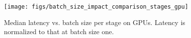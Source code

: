 \begin{figure}[!t]
    \centering
    \texttt{[image: figs/batch\_size\_impact\_comparison\_stages\_gpu]}
    \caption{Median latency vs. batch size per \lmm{} stage on GPUs. Latency is normalized to that at batch size one.
    }
    \vspace{-10pt}
    \label{fig:batch-size}
\end{figure}